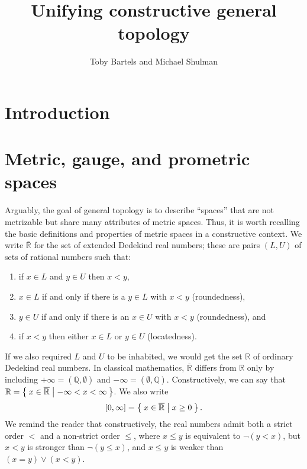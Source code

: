 \documentclass{article}
\title{Unifying constructive general topology}
\author{Toby Bartels and Michael Shulman}
\def\R{\mathbb{R}}
\def\Re{\overline{\mathbb{R}}}
\def\Rp{[0,\infty]}
\begin{document}
\maketitle

\section{Introduction}
\label{sec:intro}

\section{Metric, gauge, and prometric spaces}
\label{sec:metric}

Arguably, the goal of general topology is to describe ``spaces'' that are not metrizable but share many attributes of metric spaces.
Thus, it is worth recalling the basic definitions and properties of metric spaces in a constructive context.
We write $\Re$ for the set of extended Dedekind real numbers; these are pairs $(L,U)$ of sets of rational numbers such that:
\begin{enumerate}
\item if $x\in L$ and $y\in U$ then $x<y$,
\item $x\in L$ if and only if there is a $y\in L$ with $x<y$ (roundedness),
\item $y\in U$ if and only if there is an $x\in U$ with $x<y$ (roundedness), and
\item if $x<y$ then either $x\in L$ or $y\in U$ (locatedness).
\end{enumerate}
If we also required $L$ and $U$ to be inhabited, we would get the set $\R$ of ordinary Dedekind real numbers.
In classical mathematics, $\Re$ differs from $\R$ only by including $+\infty = (\mathbb{Q},\emptyset)$ and $-\infty = (\emptyset,\mathbb{Q})$.
Constructively, we can say that $\R = \setof{ x\in \Re | -\infty < x < \infty }$.
We also write
\[\Rp = \setof{x\in\Re | x\ge 0 }.\]
We remind the reader that constructively, the real numbers admit both a strict order $<$ and a non-strict order $\le$, where $x\le y$ is equivalent to $\neg(y<x)$, but $x<y$ is stronger than $\neg(y\le x)$, and $x\le y$ is weaker than $(x=y)\lor (x<y)$.
\end{document}
